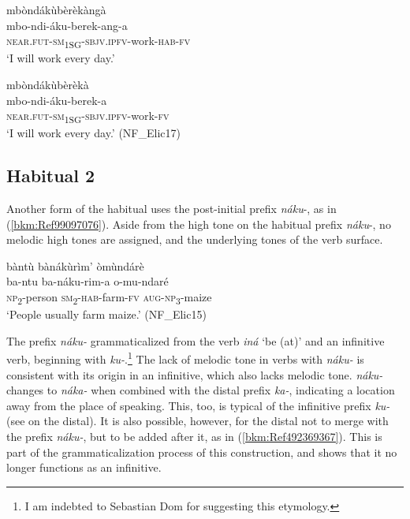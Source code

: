 \ea
\label{bkm:Ref494482341}
\glll mbòndákùbèrèkàngà\\
mbo-ndi-áku-berek-ang-a\\
\textsc{near}.\textsc{fut}-\textsc{sm}\textsubscript{1SG}-\textsc{sbjv}.\textsc{ipfv}-work-\textsc{hab}-\textsc{fv}\\
\glt ‘I will work every day.’
\z

\ea
\label{bkm:Ref72310976}
\glll mbòndákùbèrèkà\\
mbo-ndi-áku-berek-a\\
\textsc{near}.\textsc{fut}-\textsc{sm}\textsubscript{1SG}-\textsc{sbjv}.\textsc{ipfv}-work-\textsc{fv}\\
\glt ‘I will work every day.’ (NF\_Elic17)
\z
\subsection{Habitual 2}
\label{bkm:Ref489363965}\hypertarget{Toc75352695}{}
Another form of the habitual uses the post-initial prefix \textit{náku}-, as in (\ref{bkm:Ref99097076}). Aside from the high tone on the habitual prefix \textit{náku}-, no melodic high tones are assigned, and the underlying tones of the verb surface.

\ea
\label{bkm:Ref99097076}
bàntù bànákùrìm’ òmùndárè\\
\gll ba-ntu  ba-náku-rim-a  o-mu-ndaré\\
\textsc{np}\textsubscript{2}-person  \textsc{sm}\textsubscript{2}-\textsc{hab}-farm-\textsc{fv}  \textsc{aug}-\textsc{np}\textsubscript{3}-maize\\
\glt ‘People usually farm maize.’ (NF\_Elic15)
\z

The prefix \textit{náku-} grammaticalized from the verb \textit{iná} ‘be (at)’ and an infinitive verb, beginning with \textit{ku-}.\footnote{I am indebted to Sebastian Dom for suggesting this etymology.} The lack of melodic tone in verbs with \textit{náku-} is consistent with its origin in an infinitive, which also lacks melodic tone. \textit{náku-} changes to \textit{náka-} when combined with the distal prefix \textit{ka-}, indicating a location away from the place of speaking. This, too, is typical of the infinitive prefix \textit{ku-} (see  on the distal). It is also possible, however, for the distal not to merge with the prefix \textit{náku-}, but to be added after it, as in (\ref{bkm:Ref492369367}). This is part of the grammaticalization process of this construction, and shows that it no longer functions as an infinitive.


